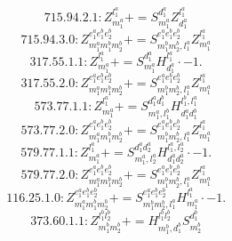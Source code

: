 \documentclass[letterpaper,10pt,fleqn,leqno,onecolumn]{article}
\begin{document}
\begin{equation} \;\;\;\;\;\;  715.94.2.1: Z^{l_{1}^{a}}_{m_{1}^{a}}+=S^{d_{1}^{a}}_{m_{1}^{a}}Z^{l_{1}^{a}}_{d_{1}^{a}} \end{equation}
\begin{equation} \;\;\;\;\;\;  715.94.3.0: Z^{e_{1}^{a}e_{1}^{b}e_{2}^{b}}_{m_{1}^{a}m_{1}^{b}m_{2}^{b}}+=S^{e_{1}^{a}e_{1}^{b}e_{2}^{b}}_{m_{1}^{b}m_{2}^{b},l_{1}^{a}}Z^{l_{1}^{a}}_{m_{1}^{a}} \end{equation}
\begin{equation} \;\;\;\;\;\;  317.55.1.1: Z^{l_{1}^{a}}_{m_{1}^{a}}+=S^{d_{1}^{a}}_{m_{1}^{a}}H^{l_{1}^{a}}_{d_{1}^{a}}\cdot -1. \end{equation}
\begin{equation} \;\;\;\;\;\;  317.55.2.0: Z^{e_{1}^{a}e_{1}^{b}e_{2}^{b}}_{m_{1}^{a}m_{1}^{b}m_{2}^{b}}+=S^{e_{1}^{a}e_{1}^{b}e_{2}^{b}}_{m_{1}^{b}m_{2}^{b},l_{1}^{a}}Z^{l_{1}^{a}}_{m_{1}^{a}} \end{equation}
\begin{equation} \;\;\;\;\;\;  573.77.1.1: Z^{l_{1}^{a}}_{m_{1}^{a}}+=S^{d_{1}^{a}d_{1}^{b}}_{m_{1}^{a},l_{1}^{b}}H^{l_{1}^{b},l_{1}^{a}}_{d_{1}^{a}d_{1}^{b}} \end{equation}
\begin{equation} \;\;\;\;\;\;  573.77.2.0: Z^{e_{1}^{a}e_{1}^{b}e_{2}^{b}}_{m_{1}^{a}m_{1}^{b}m_{2}^{b}}+=S^{e_{1}^{a}e_{1}^{b}e_{2}^{b}}_{m_{1}^{b}m_{2}^{b},l_{1}^{a}}Z^{l_{1}^{a}}_{m_{1}^{a}} \end{equation}
\begin{equation} \;\;\;\;\;\;  579.77.1.1: Z^{l_{1}^{a}}_{m_{1}^{a}}+=S^{d_{1}^{a}d_{2}^{a}}_{m_{1}^{a},l_{2}^{a}}H^{l_{1}^{a},l_{2}^{a}}_{d_{1}^{a}d_{2}^{a}}\cdot -1. \end{equation}
\begin{equation} \;\;\;\;\;\;  579.77.2.0: Z^{e_{1}^{a}e_{1}^{b}e_{2}^{b}}_{m_{1}^{a}m_{1}^{b}m_{2}^{b}}+=S^{e_{1}^{a}e_{1}^{b}e_{2}^{b}}_{m_{1}^{b}m_{2}^{b},l_{1}^{a}}Z^{l_{1}^{a}}_{m_{1}^{a}} \end{equation}
\begin{equation} \;\;\;\;\;\;  116.25.1.0: Z^{e_{1}^{a}e_{1}^{b}e_{2}^{b}}_{m_{1}^{a}m_{1}^{b}m_{2}^{b}}+=S^{e_{1}^{a}e_{1}^{b}e_{2}^{b}}_{m_{1}^{b}m_{2}^{b},l_{1}^{a}}H^{l_{1}^{a}}_{m_{1}^{a}}\cdot -1. \end{equation}
\begin{equation} \;\;\;\;\;\;  373.60.1.1: Z^{l_{1}^{b}l_{2}^{b}}_{m_{1}^{b}m_{2}^{b}}+=H^{l_{1}^{b}l_{2}^{b}}_{m_{1}^{b},d_{1}^{b}}S^{d_{1}^{b}}_{m_{2}^{b}} \end{equation}
\end{document}

